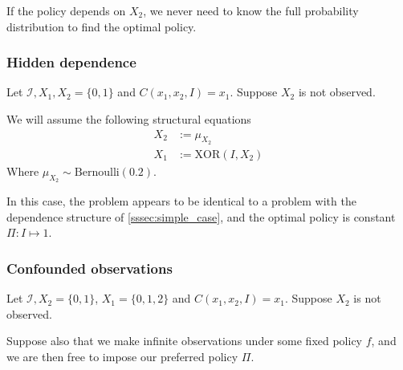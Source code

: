 \begin{remark}
If the policy depends on $X_2$, we never need to know the full probability distribution to find the optimal policy.
\end{remark}

\subsubsection{Hidden dependence}
Let $\mathcal{I},X_1,X_2=\{0,1\}$ and $C(x_1,x_2,I)=x_1$. Suppose $X_2$ is not observed.

\begin{center}
\end{center}

We will assume the following structural equations
\begin{align*}
    X_2 &:= \mu_{X_2}\\
    X_1 &:= \mathrm{XOR}(I,X_2)
\end{align*}
Where $\mu_{X_2}\sim \mathrm{Bernoulli}(0.2)$.

In this case, the problem appears to be identical to a problem with the dependence structure of \ref{sssec:simple_case}, and the optimal policy is constant $\Pi:I\mapsto 1$.

\subsubsection{Confounded observations}
Let $\mathcal{I},X_2=\{0,1\}$, $X_1=\{0,1,2\}$ and $C(x_1,x_2,I)=x_1$. Suppose $X_2$ is not observed.

Suppose also that we make infinite observations under some fixed policy $f$, and we are then free to impose our preferred policy $\Pi$.

\begin{center}
\end{center}

